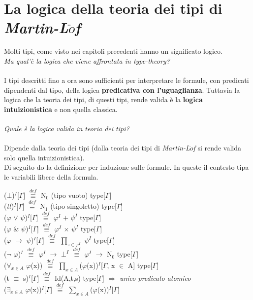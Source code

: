 \chapter{La logica della teoria dei tipi di \textit{Martin-L$\ddot{o}$f}}
\label{cap:la-logica-della-teoria-dei-tipi-di-Martin-Lof}
Molti tipi, come visto nei capitoli precedenti hanno un significato logico.\\\textit{Ma qual'\`e la logica che viene affrontata in \textit{type-theory}?}\\\\
\noindent I tipi descritti fino a ora sono sufficienti per interpretare le formule, con predicati dipendenti dal tipo, della logica \textbf{predicativa con l'uguaglianza}. Tuttavia la logica che la teoria dei tipi, di questi tipi, rende valida \`e la \textbf{logica intuizionistica} e non quella classica.\\\\
\noindent
\textit{Quale \`e la logica valida in teoria dei tipi?}\\\\
\noindent Dipende dalla teoria dei tipi (dalla teoria dei tipi di \textit{Martin-L$\ddot{o}$f} si rende valida solo quella intuizionistica).\\
Di seguito do la definizione per induzione sulle formule. In queste il contesto tipa le variabili libere della formula.
\begin{center}
($\bot$)$^I$[$\Gamma$] ${\overset{\mathit{def}}{\equiv}}$ N$_0$ (tipo vuoto) type[$\Gamma$]\\
(\textit{tt})$^I$[$\Gamma$] ${\overset{\mathit{def}}{\equiv}}$ N$_1$ (tipo singoletto) type[$\Gamma$]\\
($\varphi$ $\vee$ $\psi$)$^I$[$\Gamma$] ${\overset{\mathit{def}}{\equiv}}$ $\varphi^I$ $+$ $\psi^I$ type[$\Gamma$]\\
($\varphi$ $\&$ $\psi$)$^I$[$\Gamma$] ${\overset{\mathit{def}}{\equiv}}$ $\varphi^I$ $\times$ $\psi^I$ type[$\Gamma$]\\
($\varphi$ $\rightarrow$ $\psi$)$^I$[$\Gamma$] ${\overset{\mathit{def}}{\equiv}}$ $\prod_{z \in \varphi^I}$ $\psi^I$ type[$\Gamma$]\\
($\neg$ $\varphi$)$^I$ ${\overset{\mathit{def}}{\equiv}}$ $\varphi^I$ $\rightarrow$ $\bot^I$ ${\overset{\mathit{def}}{\equiv}}$ $\varphi^I$ $\rightarrow$ N$_0$ type[$\Gamma$]\\
($\forall_{x \in A}$ $\varphi$(x)) ${\overset{\mathit{def}}{\equiv}}$ $\prod\limits_{x \in A}$($\varphi$(x))$^I$[$\Gamma$, x $\in$ A] type[$\Gamma$]\\
(t $\equiv$ s)$^I$[$\Gamma$] ${\overset{\mathit{def}}{\equiv}}$ Id(A,t,s) type[$\Gamma$] $\Rightarrow$ \textit{unico predicato atomico}\\
($\exists_{x \in A}$ $\varphi$(x))$^I$[$\Gamma$] ${\overset{\mathit{def}}{\equiv}}$ $\sum\limits_{x \in A}$($\varphi$(x))$^I$[$\Gamma$]
\end{center}
